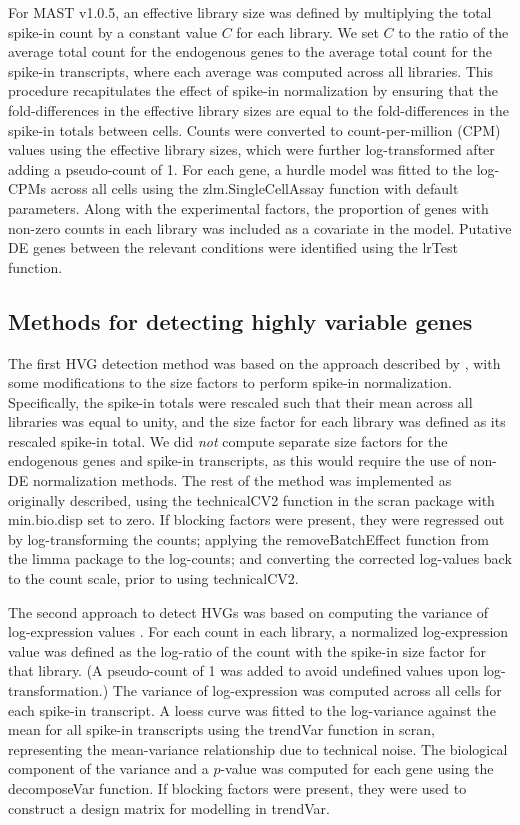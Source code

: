 \documentclass{article}
\begin{document}
For MAST v1.0.5, an effective library size was defined by multiplying the total spike-in count by a constant value $C$ for each library.
We set $C$ to the ratio of the average total count for the endogenous genes to the average total count for the spike-in transcripts, where each average was computed across all libraries.
This procedure recapitulates the effect of spike-in normalization by ensuring that the fold-differences in the effective library sizes are equal to the fold-differences in the spike-in totals between cells.
Counts were converted to count-per-million (CPM) values using the effective library sizes, which were further log-transformed after adding a pseudo-count of 1.
For each gene, a hurdle model was fitted to the log-CPMs across all cells using the zlm.SingleCellAssay function with default parameters.
Along with the experimental factors, the proportion of genes with non-zero counts in each library was included as a covariate \citep{finak2015mast} in the model.
Putative DE genes between the relevant conditions were identified using the lrTest function.

\subsection{Methods for detecting highly variable genes}
The first HVG detection method was based on the approach described by \cite{brennecke2013accounting}, with some modifications to the size factors to perform spike-in normalization.
Specifically, the spike-in totals were rescaled such that their mean across all libraries was equal to unity, and the size factor for each library was defined as its rescaled spike-in total.
We did \textit{not} compute separate size factors for the endogenous genes and spike-in transcripts, as this would require the use of non-DE normalization methods.
The rest of the method was implemented as originally described, using the technicalCV2 function in the scran package with min.bio.disp set to zero.
If blocking factors were present, they were regressed out by log-transforming the counts; applying the removeBatchEffect function from the limma package \citep{ritchie2015limma} to the log-counts; and converting the corrected log-values back to the count scale, prior to using technicalCV2.

The second approach to detect HVGs was based on computing the variance of log-expression values \citep{lun2016stepbystep}.
For each count in each library, a normalized log-expression value was defined as the log-ratio of the count with the spike-in size factor for that library.
(A pseudo-count of 1 was added to avoid undefined values upon log-transformation.)
The variance of log-expression was computed across all cells for each spike-in transcript.
A loess curve was fitted to the log-variance against the mean for all spike-in transcripts using the trendVar function in scran, representing the mean-variance relationship due to technical noise.
The biological component of the variance and a $p$-value was computed for each gene using the decomposeVar function.
If blocking factors were present, they were used to construct a design matrix for modelling in trendVar.
\end{document}
